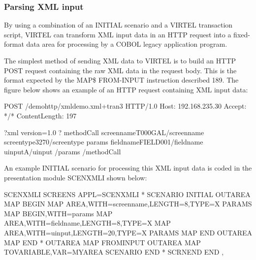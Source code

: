 \documentclass[letterpaper,10pt,english]{sphinxmanual}
\begin{document}


\subsubsection{Parsing XML input}
\label{\detokenize{User_Guide:parsing-xml-input}}\label{\detokenize{User_Guide:v457ug-xml-input-data}}
By using a combination of an INITIAL scenario and a VIRTEL transaction script, VIRTEL can transform XML input data in
an HTTP request into a fixed-format data area for processing by a COBOL legacy application program.


The simplest method of sending XML data to VIRTEL is to build an HTTP POST request containing the raw XML data in
the request body. This is the format expected by the MAP\$ FROM-INPUT instruction described 189. The figure below
shows an example of an HTTP request containing XML input data:

\begin{sphinxVerbatim}[commandchars=\\\{\}]
POST /demohttp/xmldemo.xml+tran3 HTTP/1.0
Host: 192.168.235.30
Accept: */*
Content\PYGZhy{}Length: 197

\PYGZlt{}?xml version=\PYGZdq{}1.0\PYGZdq{} ?\PYGZgt{}
\PYGZlt{}methodCall\PYGZgt{}
\PYGZlt{}screenname\PYGZgt{}T000\PYGZhy{}GAL\PYGZlt{}/screenname\PYGZgt{}
\PYGZlt{}screentype\PYGZgt{}3270\PYGZlt{}/screentype\PYGZgt{}
\PYGZlt{}params\PYGZgt{}
    \PYGZlt{}fieldname\PYGZgt{}FIELD001\PYGZlt{}/fieldname\PYGZgt{}
    \PYGZlt{}uinput\PYGZgt{}A\PYGZlt{}/uinput\PYGZgt{}
\PYGZlt{}/params\PYGZgt{}
\PYGZlt{}/methodCall\PYGZgt{}\PYGZlt{}
\end{sphinxVerbatim}



An example INITIAL scenario for processing this XML input data is coded in the presentation module SCENXMLI shown below:

\begin{sphinxVerbatim}[commandchars=\\\{\}]
SCENXMLI    SCREENS APPL=SCENXMLI
*
            SCENARIO INITIAL
OUTAREA     MAP\PYGZdl{} BEGIN
            MAP\PYGZdl{} AREA,WITH=\PYGZsq{}screenname\PYGZsq{},LENGTH=8,TYPE=X
PARAMS      MAP\PYGZdl{} BEGIN,WITH=\PYGZsq{}params\PYGZsq{}
            MAP\PYGZdl{} AREA,WITH=\PYGZsq{}fieldname\PYGZsq{},LENGTH=8,TYPE=X
            MAP\PYGZdl{} AREA,WITH=\PYGZsq{}uinput\PYGZsq{},LENGTH=20,TYPE=X
PARAMS      MAP\PYGZdl{} END
OUTAREA     MAP\PYGZdl{} END
*
OUTAREA     MAP\PYGZdl{} FROM\PYGZhy{}INPUT
OUTAREA     MAP\PYGZdl{} TO\PYGZhy{}VARIABLE,VAR=\PYGZsq{}MYAREA\PYGZsq{}
            SCENARIO END
*
            SCRNEND
END ,
\end{sphinxVerbatim}
\end{document}
